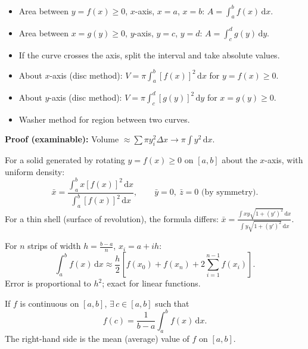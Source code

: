 \documentclass[11pt]{article}
\newcommand{\cle}[1]{{\popxbold\color{popdark}#1}}
\begin{document}
\begin{propriete}
\begin{itemize}
    \item Area between $y=f(x)\ge 0$, $x$-axis, $x=a$, $x=b$: $\displaystyle A = \int_a^b f(x)\,\mathrm{d}x$.
    \item Area between $x=g(y)\ge 0$, $y$-axis, $y=c$, $y=d$: $\displaystyle A = \int_c^d g(y)\,\mathrm{d}y$.
    \item If the curve crosses the axis, split the interval and take absolute values.
\end{itemize}
\end{propriete}

\begin{propriete}
\begin{itemize}
    \item About $x$-axis (disc method): $V = \pi \int_a^b [f(x)]^2\,\mathrm{d}x$ for $y=f(x)\ge 0$.
    \item About $y$-axis (disc method): $V = \pi \int_c^d [g(y)]^2\,\mathrm{d}y$ for $x=g(y)\ge 0$.
    \item Washer method for region between two curves.
\end{itemize}
\textbf{Proof (examinable):} Volume $\approx \sum \pi y_i^2 \Delta x \to \pi \int y^2\,\mathrm{d}x$.
\end{propriete}

\begin{propriete}
For a solid generated by rotating $y=f(x)\ge 0$ on $[a,b]$ about the $x$-axis, with uniform density:
\[
\bar{x} = \frac{\int_a^b x [f(x)]^2\,\mathrm{d}x}{\int_a^b [f(x)]^2\,\mathrm{d}x}, \qquad \bar{y}=0,\ \bar{z}=0 \text{ (by symmetry)}.
\]
For a thin shell (surface of revolution), the formula differs: $\bar{x} = \frac{\int x y \sqrt{1+(y')^2}\,\mathrm{d}x}{\int y \sqrt{1+(y')^2}\,\mathrm{d}x}$.
\end{propriete}

\begin{propriete}
For $n$ strips of width $h = \frac{b-a}{n}$, $x_i = a+ih$:
\[
\int_a^b f(x)\,\mathrm{d}x \approx \frac{h}{2}\left[ f(x_0) + f(x_n) + 2\sum_{i=1}^{n-1} f(x_i) \right].
\]
Error is proportional to $h^2$; exact for linear functions.
\end{propriete}

\begin{propriete}
If $f$ is continuous on $[a,b]$, $\exists\, c\in[a,b]$ such that
\[
f(c) = \frac{1}{b-a}\int_a^b f(x)\,\mathrm{d}x.
\]
The right-hand side is the \cle{mean (average) value} of $f$ on $[a,b]$.
\end{propriete}
\end{document}
